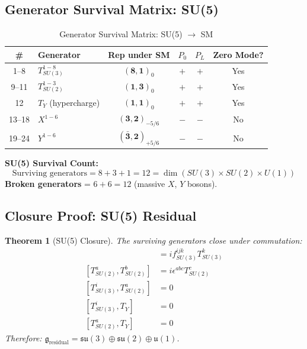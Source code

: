\documentclass[11pt,a4paper]{article}
\newtheorem{theorem}{Theorem}[section]
\begin{document}
\subsection{Generator Survival Matrix: SU(5)}

\begin{table}[ht]
\centering
\caption{Generator Survival Matrix: SU(5) $\to$ SM}
\label{tab:su5-survival}
\small
\begin{tabular}{clcccc}
\toprule
\# & Generator & Rep under SM & $P_0$ & $P_L$ & Zero Mode? \\
\midrule
1--8 & $T^{1-8}_{SU(3)}$ & $(\mathbf{8},\mathbf{1})_0$ & $+$ & $+$ & Yes \\
9--11 & $T^{1-3}_{SU(2)}$ & $(\mathbf{1},\mathbf{3})_0$ & $+$ & $+$ & Yes \\
12 & $T_Y$ (hypercharge) & $(\mathbf{1},\mathbf{1})_0$ & $+$ & $+$ & Yes \\
13--18 & $X^{1-6}$ & $(\mathbf{3},\mathbf{2})_{-5/6}$ & $-$ & $-$ & No \\
19--24 & $Y^{1-6}$ & $(\mathbf{\bar{3}},\mathbf{2})_{+5/6}$ & $-$ & $-$ & No \\
\bottomrule
\end{tabular}
\end{table}

\begin{resultbox}
\textbf{SU(5) Survival Count:}
\begin{equation}
  \text{Surviving generators} = 8 + 3 + 1 = 12 = \dim(SU(3) \times SU(2) \times U(1))
  \label{eq:su5-count}
\end{equation}
\textbf{Broken generators} = $6 + 6 = 12$ (massive $X$, $Y$ bosons).
\end{resultbox}

\subsection{Closure Proof: SU(5) Residual}

\begin{theorem}[SU(5) Closure]
\label{thm:su5-closure}
The surviving generators close under commutation:
\begin{align}
  [T^i_{SU(3)}, T^j_{SU(3)}] &= i f^{ijk}_{SU(3)} T^k_{SU(3)}
  \label{eq:su3-closure} \\
  [T^a_{SU(2)}, T^b_{SU(2)}] &= i \epsilon^{abc} T^c_{SU(2)}
  \label{eq:su2-closure} \\
  [T^i_{SU(3)}, T^a_{SU(2)}] &= 0
  \label{eq:su3-su2-commute} \\
  [T^i_{SU(3)}, T_Y] &= 0
  \label{eq:su3-u1-commute} \\
  [T^a_{SU(2)}, T_Y] &= 0
  \label{eq:su2-u1-commute}
\end{align}
Therefore: $\mathfrak{g}_{\text{residual}} = \mathfrak{su}(3) \oplus \mathfrak{su}(2) \oplus \mathfrak{u}(1)$.
\end{theorem}
\end{document}
